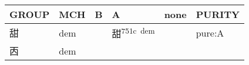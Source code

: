 \documentclass[14pt,a4paper]{scrartcl}
\begin{document}
\begin{longtable}[c]{@{}llllll@{}}
\toprule
\begin{minipage}[b]{0.14\columnwidth}\raggedright\strut
GROUP
\strut\end{minipage} &
\begin{minipage}[b]{0.14\columnwidth}\raggedright\strut
MCH
\strut\end{minipage} &
\begin{minipage}[b]{0.14\columnwidth}\raggedright\strut
B
\strut\end{minipage} &
\begin{minipage}[b]{0.14\columnwidth}\raggedright\strut
A
\strut\end{minipage} &
\begin{minipage}[b]{0.14\columnwidth}\raggedright\strut
none
\strut\end{minipage} &
\begin{minipage}[b]{0.14\columnwidth}\raggedright\strut
PURITY
\strut\end{minipage}\tabularnewline
\midrule
\endhead
\begin{minipage}[t]{0.14\columnwidth}\raggedright\strut
甜
\strut\end{minipage} &
\begin{minipage}[t]{0.14\columnwidth}\raggedright\strut
dem
\strut\end{minipage} &
\begin{minipage}[t]{0.14\columnwidth}\raggedright\strut
\strut\end{minipage} &
\begin{minipage}[t]{0.14\columnwidth}\raggedright\strut
甜\textsuperscript{751c~dem}
\strut\end{minipage} &
\begin{minipage}[t]{0.14\columnwidth}\raggedright\strut
\strut\end{minipage} &
\begin{minipage}[t]{0.14\columnwidth}\raggedright\strut
pure:A
\strut\end{minipage}\tabularnewline
\begin{minipage}[t]{0.14\columnwidth}\raggedright\strut
㐁
\strut\end{minipage} &
\begin{minipage}[t]{0.14\columnwidth}\raggedright\strut
dem
\strut\end{minipage} &
\begin{minipage}[t]{0.14\columnwidth}\raggedright\strut
\strut\end{minipage} &
\begin{minipage}[t]{0.14\columnwidth}\raggedright\strut

\end{minipage}
\end{longtable}
\end{document}
